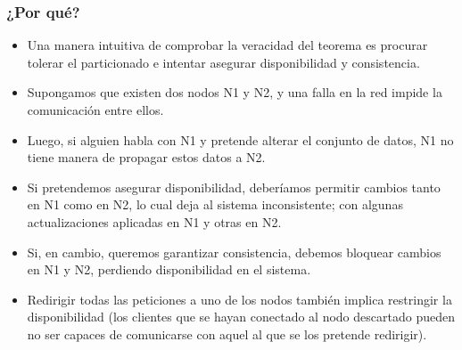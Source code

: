 \begin{frame}
\frametitle{¿Por qué?}
\begin{itemize}

	\item	Una manera intuitiva de comprobar la veracidad del teorema es procurar tolerar el particionado e intentar asegurar disponibilidad y consistencia. \pause
	\item	Supongamos que existen dos nodos N1 y N2, y una falla en la red impide la comunicación entre ellos. \pause
	\item	Luego, si alguien habla con N1 y pretende alterar el conjunto de datos, N1 no tiene manera de propagar estos datos a N2. \pause
	\item	Si pretendemos asegurar disponibilidad, deberíamos permitir cambios tanto en N1 como en N2, lo cual deja al sistema inconsistente; con algunas actualizaciones aplicadas en N1 y otras en N2. \pause
	\item	Si, en cambio, queremos garantizar consistencia, debemos bloquear cambios en N1 y N2, perdiendo disponibilidad en el sistema. \pause
	\item	Redirigir todas las peticiones a uno de los nodos también implica restringir la disponibilidad (los clientes que se hayan conectado al nodo descartado pueden no ser capaces de comunicarse con aquel al que se los pretende redirigir).

\end{itemize}
\end{frame}
